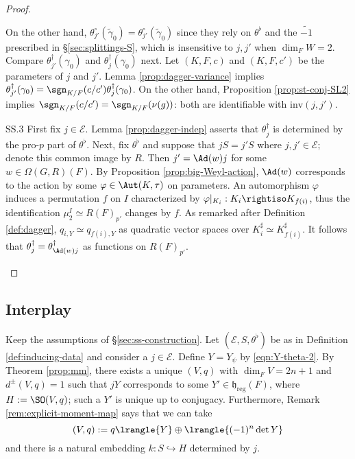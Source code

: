 \documentclass[a4paper,10pt]{article}
\begin{document}
\begin{proof}
\begin{asparadesc}
		On the other hand, $\theta^\circ_{j'}(\tilde{\gamma}_0) = \theta^\circ_{j'}(\tilde{\gamma}_0)$ since they rely on $\theta^\flat$ and the $\widetilde{-1}$ prescribed in \S\ref{sec:splittings-S}, which is insensitive to $j, j'$ when $\dim_F W = 2$. Compare $\theta^\dagger_{j'}(\gamma_0)$ and $\theta^\dagger_j(\gamma_0)$ next. Let $(K, F, c)$ and $(K, F, c')$ be the parameters of $j$ and $j'$. Lemma \ref{prop:dagger-variance} implies $\theta^\dagger_{j'}(\gamma_0) = \sgn_{K/F}(c/c') \theta^\dagger_j(\gamma_0)$. On the other hand, Proposition \ref{prop:st-conj-SL2} implies $\sgn_{K/F}(c/c') = \sgn_{K/F}(\nu(g))$: both are identifiable with $\text{inv}(j, j')$.
		
		\item[SS.3]\quad First fix $j \in \mathcal{E}$. Lemma \ref{prop:dagger-indep} asserts that $\theta_j^\dagger$ is determined by the pro-$p$ part of $\theta^\flat$. Next, fix $\theta^\flat$ and suppose that $jS = j'S$ where $j, j' \in \mathcal{E}$; denote this common image by $R$. Then $j' = \Ad(w) j$ for some $w \in \Omega(G,R)(F)$. By Proposition \ref{prop:big-Weyl-action}, $\Ad(w)$ corresponds to the action by some $\varphi \in \Aut(K,\tau)$ on parameters. An automorphism $\varphi$ induces a permutation $f$ on $I$ characterized by $\varphi|_{K_i}: K_i \rightiso K_{f(i)}$, thus the identification $\mu_2^I \simeq R(F)_{p'}$ changes by $f$. As remarked after Definition \ref{def:dagger}, $q_{i,Y} \simeq q_{f(i), Y}$ as quadratic vector spaces over $K_i^\sharp \simeq K_{f(i)}^{\sharp}$. It follows that $\theta_j^\dagger = \theta_{\Ad(w)j}^\dagger$ as functions on $R(F)_{p'}$.
	\end{asparadesc}
\end{proof}

\subsection{Interplay}\label{sec:interplay}
Keep the assumptions of \S\ref{sec:ss-construction}. Let $(\mathcal{E}, S, \theta^\flat)$ be as in Definition \ref{def:inducing-data} and consider a $j \in \mathcal{E}$. Define $Y = Y_\psi$ by \eqref{eqn:Y-theta-2}. By Theorem \ref{prop:mm}, there exists a unique $(V,q)$ with $\dim_F V = 2n+1$ and $d^\pm(V,q)=1$ such that $jY$ corresponds to some $Y' \in \mathfrak{h}_\text{reg}(F)$, where $H := \SO(V,q)$; such a $Y'$ is unique up to conjugacy. Furthermore, Remark \ref{rem:explicit-moment-map} says that we can take
\[ (V,q) := q\lrangle{Y} \oplus \lrangle{(-1)^n \det Y} \]
and there is a natural embedding $k: S \hookrightarrow H$ determined by $j$.
\end{document}
